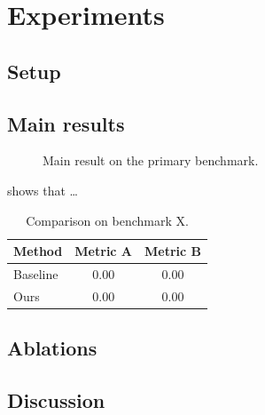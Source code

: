 \chapter{Experiments}
\label{chap:experiments}

\section{Setup}
\label{sec:exp:setup}


\section{Main results}
\label{sec:exp:main}

\begin{figure}[htbp]
  \centering
  \caption{Main result on the primary benchmark.}
  \label{fig:exp:main}
\end{figure}

 shows that \dots

\begin{table}[htbp]
  \centering
  \begin{tabular}{lcc}
    \toprule
    Method & Metric A & Metric B \\
    \midrule
    Baseline & 0.00 & 0.00 \\
    Ours     & 0.00 & 0.00 \\
    \bottomrule
  \end{tabular}
  \caption{Comparison on benchmark X.}
  \label{tab:exp:comparison}
\end{table}

\section{Ablations}
\label{sec:exp:ablations}


\section{Discussion}
\label{sec:exp:discussion}

